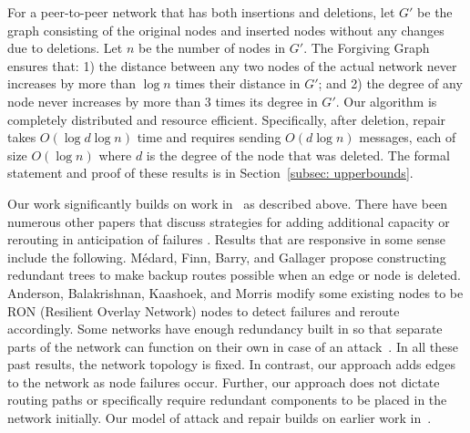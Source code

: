 \documentclass[11pt, letter]{article}
\begin{document}
\medskip
{}  For a peer-to-peer network that has both insertions and deletions, let $G'$ be the graph consisting of the original nodes and inserted nodes without any changes due to deletions. Let $n$ be the number of
nodes in $G'$. The Forgiving Graph ensures that: 1) the distance between any two nodes of the actual network never increases by more than $\log n$ times their distance in $G'$; and 2) the degree of any node never increases by more than $3$ times its degree in $G'$.  Our algorithm is completely distributed and resource efficient.  Specifically, after deletion, repair takes
$O(\log d\log n)$ time and requires sending $O(d\log n)$ messages, each of size $O(\log n)$ where $d$ is the degree
of the node that was deleted. The formal statement and proof of these results is in Section~\ref{subsec: upperbounds}. 

\medskip
{} 
Our work significantly builds on work in~\cite{HayesPODC08} as described above.  There have been numerous other papers that
discuss strategies for adding additional capacity or rerouting in
anticipation of failures \cite{ doverspike94capacity,
frisanco97capacity, iraschko98capacity, murakami97comparative,
caenegem97capacity, xiong99restore}.  Results that
are responsive in some sense include the following.  M\'{e}dard, Finn, Barry, and Gallager
\cite{medard99redundant} propose constructing redundant trees to make
backup routes possible when an edge or node is deleted.  Anderson,
Balakrishnan, Kaashoek, and Morris \cite{anderson01RON} modify some
existing nodes to be RON (Resilient Overlay Network) nodes to detect
failures and reroute accordingly. Some networks have enough redundancy
built in so that separate parts of the network can function on their
own in case of an attack~\cite{goel04resilient}.  In all these past
results, the network topology is fixed.  In contrast, our approach
adds edges to the network as node failures occur.  Further, our
approach does not dictate routing paths or specifically require
redundant components to be placed in the network initially.   Our model of attack and repair builds on earlier work in~\cite{BomanSAS06, SaiaTrehanIPDPS08}.
\end{document}
